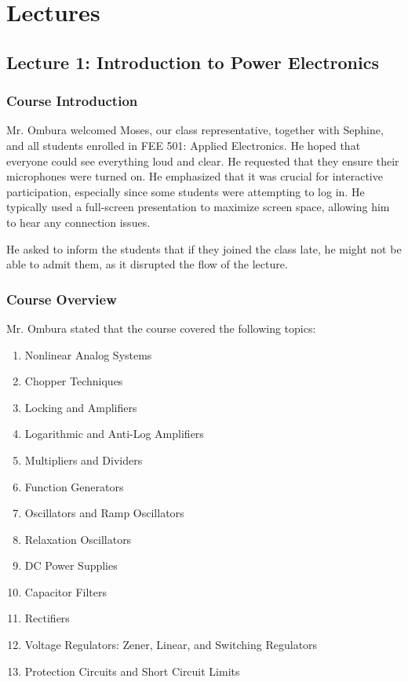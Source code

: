 \chapter{Lectures}
\section{Lecture 1: Introduction to Power Electronics}

\subsection{Course Introduction}

Mr. Ombura welcomed Moses, our class representative, together with Sephine, and all students enrolled in FEE 501: Applied Electronics. He hoped that everyone could see everything loud and clear. He requested that they ensure their microphones were turned on. He emphasized that it was crucial for interactive participation, especially since some students were attempting to log in. He typically used a full-screen presentation to maximize screen space, allowing him to hear any connection issues.

He asked to inform the students that if they joined the class late, he might not be able to admit them, as it disrupted the flow of the lecture.

\subsection{Course Overview}

Mr. Ombura stated that the course covered the following topics:

\begin{enumerate}
    \item Nonlinear Analog Systems
    \item Chopper Techniques
    \item Locking and Amplifiers
    \item Logarithmic and Anti-Log Amplifiers
    \item Multipliers and Dividers
    \item Function Generators
    \item Oscillators and Ramp Oscillators
    \item Relaxation Oscillators
    \item DC Power Supplies
    \item Capacitor Filters
    \item Rectifiers
    \item Voltage Regulators: Zener, Linear, and Switching Regulators
    \item Protection Circuits and Short Circuit Limits
\end{enumerate}

